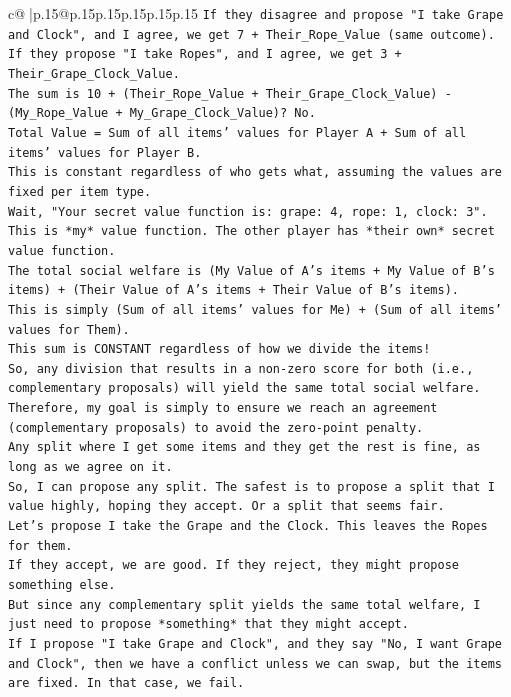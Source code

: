 \documentclass{article}
\begin{document}
{\begin{supertabular}{c@{$\;$}|p{.15\linewidth}@{}p{.15\linewidth}p{.15\linewidth}p{.15\linewidth}p{.15\linewidth}p{.15\linewidth}}
{{{\texttt{If they disagree and propose "I take Grape and Clock", and I agree, we get 7 + Their\_Rope\_Value (same outcome).} \\
\texttt{If they propose "I take Ropes", and I agree, we get 3 + Their\_Grape\_Clock\_Value.} \\
\texttt{The sum is 10 + (Their\_Rope\_Value + Their\_Grape\_Clock\_Value) {-} (My\_Rope\_Value + My\_Grape\_Clock\_Value)? No.} \\
\texttt{Total Value = Sum of all items' values for Player A + Sum of all items' values for Player B.} \\
\texttt{This is constant regardless of who gets what, assuming the values are fixed per item type.} \\
\texttt{Wait, "Your secret value function is: grape: 4, rope: 1, clock: 3". This is *my* value function. The other player has *their own* secret value function.} \\
\texttt{The total social welfare is (My Value of A's items + My Value of B's items) + (Their Value of A's items + Their Value of B's items).} \\
\texttt{This is simply (Sum of all items' values for Me) + (Sum of all items' values for Them).} \\
\texttt{This sum is CONSTANT regardless of how we divide the items!} \\
\texttt{So, any division that results in a non{-}zero score for both (i.e., complementary proposals) will yield the same total social welfare.} \\
\texttt{Therefore, my goal is simply to ensure we reach an agreement (complementary proposals) to avoid the zero{-}point penalty.} \\
\texttt{Any split where I get some items and they get the rest is fine, as long as we agree on it.} \\
\texttt{So, I can propose any split. The safest is to propose a split that I value highly, hoping they accept. Or a split that seems fair.} \\
\texttt{Let's propose I take the Grape and the Clock. This leaves the Ropes for them.} \\
\texttt{If they accept, we are good. If they reject, they might propose something else.} \\
\texttt{But since any complementary split yields the same total welfare, I just need to propose *something* that they might accept.} \\
\texttt{If I propose "I take Grape and Clock", and they say "No, I want Grape and Clock", then we have a conflict unless we can swap, but the items are fixed. In that case, we fail.} \\
}}}
\end{supertabular}}
\end{document}
